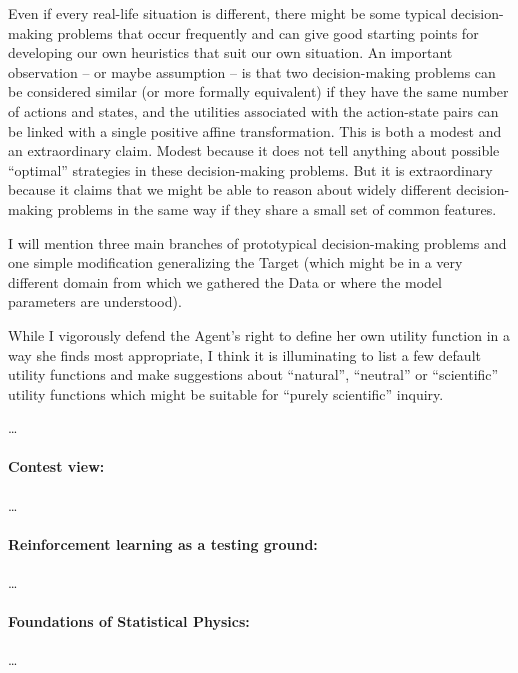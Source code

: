 \documentclass{article}
\begin{document}
Even if every real-life situation is different, there might be some typical decision-making problems that occur frequently and can give good starting points for developing our own heuristics that suit our own situation.
An important observation -- or maybe assumption -- is that two decision-making problems can be considered similar (or more formally equivalent) if they have the same number of actions and states, and the utilities associated with the action-state pairs can be linked with a single positive affine transformation.
This is both a modest and an extraordinary claim. Modest because it does not tell anything about possible ``optimal'' strategies in these decision-making problems. But it is extraordinary because it claims that we might be able to reason about widely different decision-making problems in the same way if they share a small set of common features.

I will mention three main branches of prototypical decision-making problems and one simple modification generalizing the Target (which might be in a very different domain from which we gathered the Data or where the model parameters are understood).

While I vigorously defend the Agent's right to define her own utility function in a way she finds most appropriate, I think it is illuminating to list a few default utility functions and make suggestions about ``natural'', ``neutral'' or ``scientific'' utility functions which might be suitable for ``purely scientific'' inquiry.

\dots


\paragraph{Contest view:}
\dots


\paragraph{Reinforcement learning as a testing ground:}
\dots


\paragraph{Foundations of Statistical Physics:}
\dots

\end{document}
